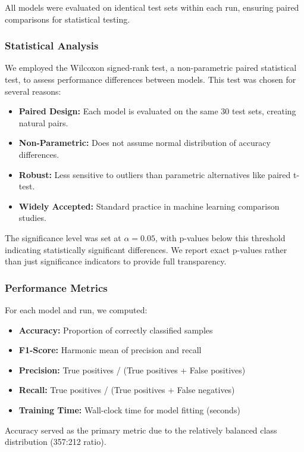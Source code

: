 \documentclass[12pt, a4paper]{article}
\begin{document}
All models were evaluated on identical test sets within each run, ensuring paired comparisons for statistical testing.

\subsubsection{Statistical Analysis}
We employed the Wilcoxon signed-rank test, a non-parametric paired statistical test, to assess performance differences between models. This test was chosen for several reasons:
\begin{itemize}
    \item \textbf{Paired Design:} Each model is evaluated on the same 30 test sets, creating natural pairs.
    \item \textbf{Non-Parametric:} Does not assume normal distribution of accuracy differences.
    \item \textbf{Robust:} Less sensitive to outliers than parametric alternatives like paired t-test.
    \item \textbf{Widely Accepted:} Standard practice in machine learning comparison studies.
\end{itemize}

The significance level was set at $\alpha = 0.05$, with p-values below this threshold indicating statistically significant differences. We report exact p-values rather than just significance indicators to provide full transparency.

\subsubsection{Performance Metrics}
For each model and run, we computed:
\begin{itemize}
    \item \textbf{Accuracy:} Proportion of correctly classified samples
    \item \textbf{F1-Score:} Harmonic mean of precision and recall
    \item \textbf{Precision:} True positives / (True positives + False positives)
    \item \textbf{Recall:} True positives / (True positives + False negatives)
    \item \textbf{Training Time:} Wall-clock time for model fitting (seconds)
\end{itemize}

Accuracy served as the primary metric due to the relatively balanced class distribution (357:212 ratio).
\end{document}
